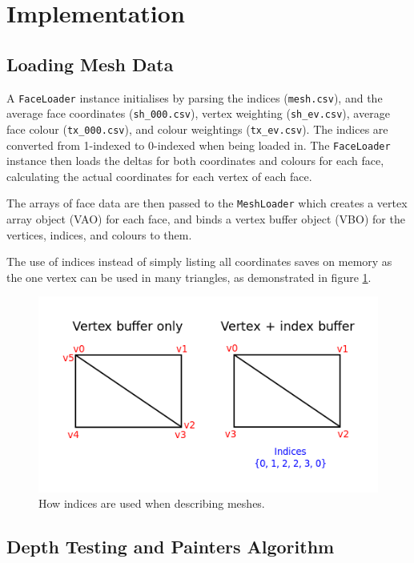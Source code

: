 \documentclass[12pt]{article}
\begin{document}
\section{Implementation}

\subsection{Loading Mesh Data}

A \texttt{FaceLoader} instance initialises by parsing the indices (\texttt{mesh.csv}), and the average face coordinates (\texttt{sh\_000.csv}), vertex weighting (\texttt{sh\_ev.csv}), average face colour (\texttt{tx\_000.csv}), and colour weightings (\texttt{tx\_ev.csv}).
The indices are converted from 1-indexed to 0-indexed when being loaded in.
The \texttt{FaceLoader} instance then loads the deltas for both coordinates and colours for each face, calculating the actual coordinates for each vertex of each face.

The arrays of face data are then passed to the \texttt{MeshLoader} which creates a vertex array object (VAO) for each face, and binds a vertex buffer object (VBO) for the vertices, indices, and colours to them.

The use of indices instead of simply listing all coordinates saves on memory as the one vertex can be used in many triangles, as demonstrated in figure \ref{fig:index_mesh}.

\begin{figure}[!ht]
	\centering
	\includegraphics[width=\linewidth]{images/vertex_vs_index}
	\caption{How indices are used when describing meshes.}
	\label{fig:index_mesh}
\end{figure}

\subsection{Depth Testing and Painters Algorithm}
\end{document}
